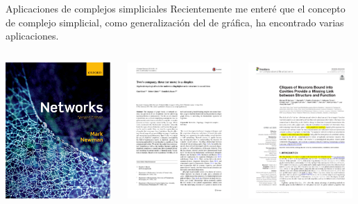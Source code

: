 \documentclass[spanish, presentation, aspectratio=169]{beamer}
\begin{document}
\begin{frame}[label={sec:org60948ad}]{Aplicaciones de complejos simpliciales}
Recientemente me enteré que el concepto de complejo simplicial, como \alert{generalización} del de gráfica, ha encontrado varias aplicaciones.

\begin{columns}
\begin{column}{0.3\columnwidth}
\begin{center}
\includegraphics[height=5.2cm]{newman.pdf}
\end{center}
\end{column}

\begin{column}{0.3\columnwidth}
\begin{center}
\includegraphics[height=5.2cm]{giusti1.pdf}
\end{center}
\end{column}


\begin{column}{0.3\columnwidth}
\begin{center}
\includegraphics[height=5.2cm]{reimann.pdf}
\end{center}
\end{column}
\end{columns}
\end{frame}
\end{document}
